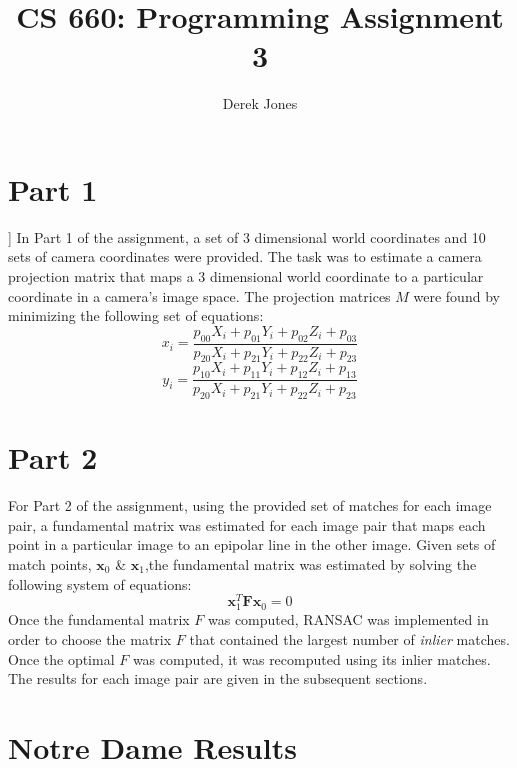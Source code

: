 \documentclass{article}
\title{CS 660: Programming Assignment 3}
\author{Derek Jones}
\begin{document}
\maketitle

	\section{Part 1}]
In Part 1 of the assignment, a set of 3 dimensional world coordinates and 10 sets of camera coordinates were provided. The task was to estimate a camera projection matrix that maps a 3 dimensional world coordinate to a particular coordinate in a camera's image space. The projection matrices $M$ were found by minimizing the following set of equations:
\begin{equation}
x_i = \frac{p_{00}X_{i} + p_{01}Y_{i} + p_{02}Z_{i} + p_{03}}{p_{20}X_{i} + p_{21}Y_{i} + p_{22}Z_{i} +p_{23}}
\end{equation}
\begin{equation}
y_i = \frac{p_{10}X_{i} + p_{11}Y_{i} + p_{12}Z_{i} + p_{13}}{p_{20}X_{i} + p_{21}Y_{i} + p_{22}Z_{i} +p_{23}}
\end{equation}		

	\section{Part 2}
For Part 2 of the assignment, using the provided set of matches for each image pair, a fundamental matrix was estimated for each image pair that maps each point in a particular image to an epipolar line in the other image. Given sets of match points, $\mathbf{x}_{0}$ \& $\mathbf{x}_{1}$,the fundamental matrix was estimated by solving the following system of equations:
	\begin{equation}
		\mathbf{x}_{1}^{T}\mathbf{F}\mathbf{x}_{0} = 0
	\end{equation}
Once the fundamental matrix $F$ was computed, RANSAC was implemented in order to choose the matrix $F$ that contained the largest number of \emph{inlier} matches. Once the optimal $F$ was computed, it was recomputed using its inlier matches. The results for each image pair are given in the subsequent sections.




		\section{Notre Dame Results}
\end{document}
